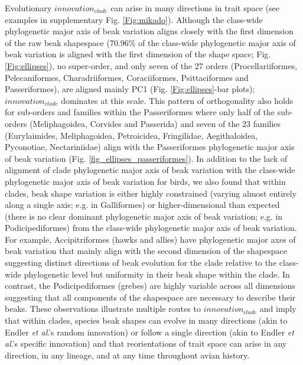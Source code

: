 \documentclass[12pt,letterpaper]{article}
\begin{document}
Evolutionary $innovation_{clade}$ can arise in many directions in trait space (see examples in supplementary Fig. \ref{Fig:mikado}). %
Although the class-wide phylogenetic major axis of beak variation aligns closely with the first dimension of the raw beak shapespace (70.96\% of the class-wide phylogenetic major axis of beak variation is aligned with the first dimension of the shape space; Fig. \ref{Fig:ellipses}), no super-order, and only seven of the 27 orders (Procellariiformes, Pelecaniformes, Charadriiformes, Coraciiformes, Psittaciformes and Passeriformes), are aligned mainly PC1 (Fig. \ref{Fig:ellipses}-bar plots); $innovation_{clade}$ dominates at this scale.
This pattern of orthogonality also holds for sub-orders and families within the Passeriformes where only half of the sub-orders (Meliphagoidea, Corvides and Passerida) and seven of the 23 families (Eurylaimides, Meliphagoidea, Petroicidea, Fringilidae, Aegithaloidea, Pyconotiae, Nectariniidae) align with the Passeriformes phylogenetic major axis of beak variation (Fig.
\ref{fig_ellipses_passeriformes}).
In addition to the lack of alignment of clade phylogenetic major axis of beak variation with the class-wide phylogenetic major axis of beak variation for birds, we also found that within clades, beak shape variation is either highly constrained (varying almost entirely along a single axis; e.g. in Galliformes) or higher-dimensional than expected (there is no clear dominant phylogenetic major axis of beak variation; e.g. in Podicipediformes) from the class-wide phylogenetic major axis of beak variation.
For example, Accipitriformes (hawks and allies) have phylogenetic major axes of beak variation that mainly align with the second dimension of the shapespace suggesting distinct directions of beak evolution for the clade relative to the class-wide phylogenetic level but uniformity in their beak shape within the clade.
In contrast, the Podicipediformes (grebes) are highly variable across all dimensions suggesting that all components of the shapespace are necessary to describe their beaks.
These observations illustrate multiple routes to $innovation_{clade}$ and imply that within clades, species beak shapes can evolve in many directions (akin to Endler \textit{et al}.'s \cite{endler2005animal} random innovation) or follow a single direction (akin to Endler \textit{et al}.'s \cite{endler2005animal} specific innovation) and that reorientations of trait space can arise in any direction, in any lineage, and at any time throughout avian history.
\end{document}
